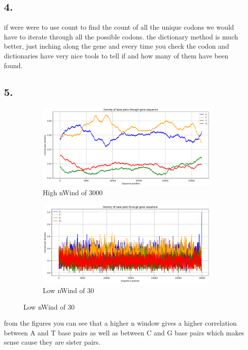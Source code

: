 \documentclass{article}
\begin{document}
\subsection*{4.}
if were were to use count to find the count of all the unique codons we would have to iterate through all the 
possible codons. the dictionary method is much better, just inching along the gene and every time you check the codon
and dictionaries have very nice tools to tell if and how many of them have been found.

\subsection*{5.}
\begin{figure}[h]
    \centering
    \begin{subfigure}[t]{0.45\textwidth}
        \centering
        \includegraphics[width=\textwidth]{density3000nwind.png}
        \caption{High nWind of 3000}
        \label{fig:density}
    \end{subfigure}
    \hfill
    \begin{subfigure}[t]{0.45\textwidth}
        \centering
        \includegraphics[width=\textwidth]{density30nwind.png}
        \caption{Low nWind of 30}
        \label{fig:histosc2}
    \end{subfigure}
\end{figure} 
from the figures you can see that a higher n window gives a higher correlation between A and T base pairs
as well as between C and G base pairs which makes sense cause they are sister pairs.
\end{document}
